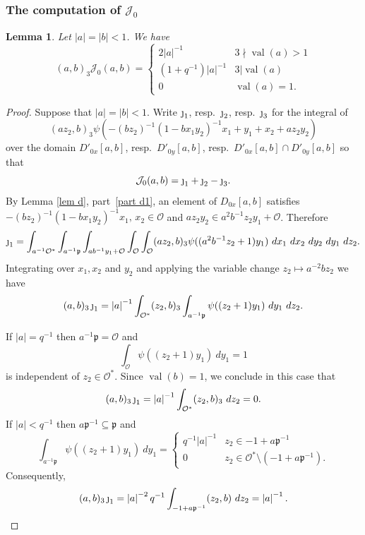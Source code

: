 \documentclass[12pt]{amsart}
\newcommand{\abs}[1]{\left|{#1}\right|}
\newcommand{\p}{\mathfrak{p}}
\newcommand{\J}{\mathcal{J}}
\renewcommand{\O}{\mathcal{O}}
\newcommand{\val}{{\operatorname{val}}}
\newtheorem{lemma}[theorem]{Lemma}
\theoremstyle{remark}
\begin{document}
\subsubsection{The computation of $\J_0$}
\begin{lemma}\label{lem j0}
Let $\abs{a}=\abs{b}<1$. We have
\[
(a,b)_3\J_0(a,b)=\begin{cases} 2\abs{a}^{-1} & 3\nmid \val(a)>1 \\ (1+q^{-1})\abs{a}^{-1} & 3|\val(a)\\ 0 & \val(a)=1. \end{cases}
\]
\end{lemma}
\begin{proof}
Suppose that $\abs{a}=\abs{b}<1$. Write $\text{\j}_1$, resp.\ $\text{\j}_2$, resp.\ $\text{\j}_3$ for the integral of 
\[
(az_2,b)_3\psi(-(b z_2)^{-1}(1-bx_1y_2)^{-1}x_1+y_1+x_2+az_2y_2)
\]
over the domain $D'_{0x}[a,b]$, resp.\ $D'_{0y}[a,b]$, resp.\ $D'_{0x}[a,b]\cap D'_{0y}[a,b]$ so that
\[
\J_0(a,b)=\text{\j}_1+\text{\j}_2-\text{\j}_3.
\]
By Lemma \ref{lem d}, part~\ref{part d1},  an element of $D_{0x}[a,b]$ satisfies 
$-(b z_2)^{-1}(1-bx_1y_2)^{-1}x_1,\,x_2\in \O$ and $az_2y_2\in a^2b^{-1}z_2y_1+\O$. Therefore
\[
\text{\j}_1=\int_{a^{-1}\O^*}\int_{a^{-1}\p}\int_{ab^{-1}y_1+\O}\int_\O\int_\O (az_2,b)_3\psi((a^2b^{-1}z_2+1)y_1)\ dx_1\ dx_2\ dy_2\ dy_1\ dz_2.
\]
Integrating over $x_1,x_2$ and $y_2$ and applying the variable change $z_2\mapsto a^{-2}bz_2$ we have
\begin{equation}\label{eq j1}
(a,b)_3\,\text{\j}_1=\abs{a}^{-1}\int_{\O^*}(z_2,b)_3\int_{a^{-1}\p}\psi((z_2+1)y_1)\ dy_1\ dz_2.
\end{equation}

If $\abs{a}=q^{-1}$ then $a^{-1}\p=\O$ and
\[
\int_\O \psi((z_2+1)y_1)\ dy_1=1
\]
is independent of $z_2\in\O^*$. Since $\val(b)=1$, we conclude in this case that
\[
(a,b)_3\,\text{\j}_1=\abs{a}^{-1}\int_{\O^*}(z_2,b)_3\ dz_2=0.
\]
If $\abs{a}<q^{-1}$ then $a\p^{-1}\subseteq \p$ and
\[
\int_{a^{-1}\p}\psi((z_2+1)y_1)\ dy_1=\begin{cases} q^{-1}\abs{a}^{-1} & z_2\in -1+a\p^{-1} \\ 0 & z_2\in \O^* \setminus (-1+a\p^{-1}).\end{cases}
\]
Consequently, 
\[
(a,b)_3\,\text{\j}_1=\abs{a}^{-2}q^{-1} \int_{-1+a\p^{-1}} (z_2,b)\ dz_2=\abs{a}^{-1}.
\]


\end{proof}
\end{document}

